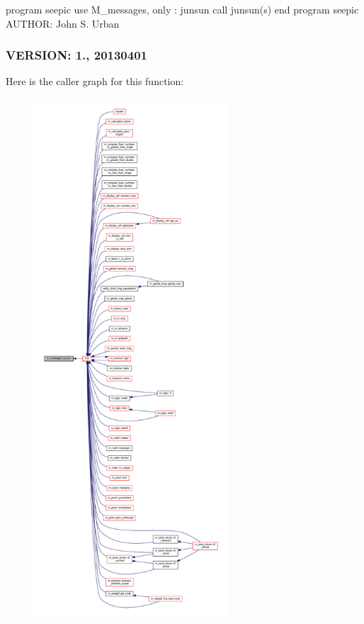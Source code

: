 program seepic use M\+\_\+messages, only \+: junsun call junsun(\textquotesingle{}s\textquotesingle{}) end program seepic A\+U\+T\+H\+OR\+: John S. Urban \subsubsection*{V\+E\+R\+S\+I\+ON\+: 1., 20130401}Here is the caller graph for this function\+:
\nopagebreak
\begin{figure}[H]
\begin{center}
\leavevmode
\includegraphics[height=550pt]{namespacem__messages_a93650d7a0b4288d714aa9eb575366137_icgraph}
\end{center}
\end{figure}
\mbox{\label{namespacem__messages_ab7a9bba52e514a4183070ae0fc6ccebd}} 
